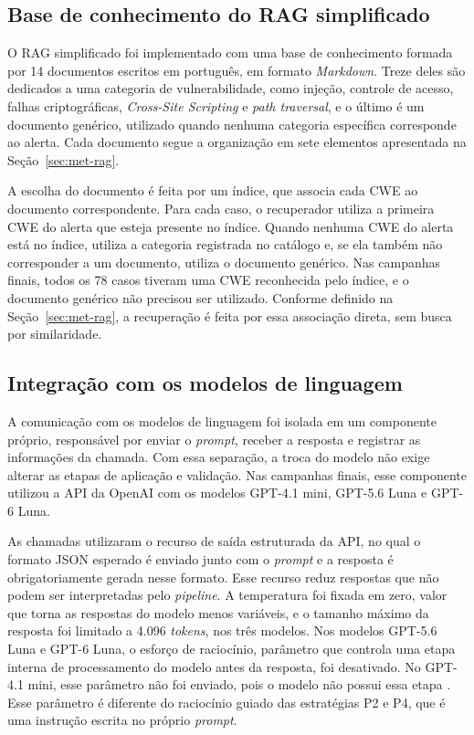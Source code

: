 \subsection{Base de conhecimento do RAG simplificado}
\label{sec:impl-rag}

O RAG simplificado foi implementado com uma base de conhecimento formada por 14 documentos escritos em português, em formato \textit{Markdown}. Treze deles são dedicados a uma categoria de vulnerabilidade, como injeção, controle de acesso, falhas criptográficas, \textit{Cross-Site Scripting} e \textit{path traversal}, e o último é um documento genérico, utilizado quando nenhuma categoria específica corresponde ao alerta. Cada documento segue a organização em sete elementos apresentada na Seção~\ref{sec:met-rag}.

A escolha do documento é feita por um índice, que associa cada CWE ao documento correspondente. Para cada caso, o recuperador utiliza a primeira CWE do alerta que esteja presente no índice. Quando nenhuma CWE do alerta está no índice, utiliza a categoria registrada no catálogo e, se ela também não corresponder a um documento, utiliza o documento genérico. Nas campanhas finais, todos os 78 casos tiveram uma CWE reconhecida pelo índice, e o documento genérico não precisou ser utilizado. Conforme definido na Seção~\ref{sec:met-rag}, a recuperação é feita por essa associação direta, sem busca por similaridade.

\subsection{Integração com os modelos de linguagem}
\label{sec:impl-modelos}

A comunicação com os modelos de linguagem foi isolada em um componente próprio, responsável por enviar o \textit{prompt}, receber a resposta e registrar as informações da chamada. Com essa separação, a troca do modelo não exige alterar as etapas de aplicação e validação. Nas campanhas finais, esse componente utilizou a API da OpenAI com os modelos GPT-4.1 mini, GPT-5.6 Luna e GPT-6 Luna.

As chamadas utilizaram o recurso de saída estruturada da API, no qual o formato JSON esperado é enviado junto com o \textit{prompt} e a resposta é obrigatoriamente gerada nesse formato. Esse recurso reduz respostas que não podem ser interpretadas pelo \textit{pipeline}. A temperatura foi fixada em zero, valor que torna as respostas do modelo menos variáveis, e o tamanho máximo da resposta foi limitado a 4.096 \textit{tokens}, nos três modelos. Nos modelos GPT-5.6 Luna e GPT-6 Luna, o esforço de raciocínio, parâmetro que controla uma etapa interna de processamento do modelo antes da resposta, foi desativado. No GPT-4.1 mini, esse parâmetro não foi enviado, pois o modelo não possui essa etapa \cite{openai_gpt41mini}. Esse parâmetro é diferente do raciocínio guiado das estratégias P2 e P4, que é uma instrução escrita no próprio \textit{prompt}.

